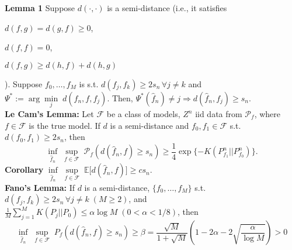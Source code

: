 \documentclass[10pt,twocolumn]{article}
\begin{document}
    \textbf{Lemma 1} Suppose $d(\cdot,\cdot)$ is a semi-distance (i.e., it satisfies 
    \begin{inparaenum}
    \item $d(f,g) = d(g,f) \geq 0$,
    \item $d(f,f) = 0$,
    \item $d(f,g) \geq d(h,f) + d(h,g)$
    \end{inparaenum}
    ). Suppose $f_0,\ldots,f_M$ is s.t. $d(f_j,f_k) \geq 2s_n \, \forall j \neq k$ and $\Psi^* := \arg \underset{j}{\min} \; d(\hat{f}_n,f,f_j)$. Then, $\Psi^*(\hat{f}_n) \neq j \Rightarrow d(\hat{f}_n,f_j) \geq s_n$.\\
    \textbf{Le Cam's Lemma:} Let $\mathcal{F}$ be a class of models, $Z^n$ iid data from $\mathcal{P}_f$, where $f\in\mathcal{F}$ is the true model. If $d$ is a semi-distance and $f_0,f_1 \in \mathcal{F}$ s.t. $d(f_0,f_1) \geq 2s_n$, then 
    \begin{equation}
        \underset{\hat{f}_n}{\inf} \; \underset{f\in\mathcal{F}} {\sup} \; \mathcal{P}_f(d(\hat{f}_n,f) \geq s_n) \geq \frac{1}{4} \exp\lbrace-K(P^n_{f_1} || P^n_{f_0})\rbrace.
    \end{equation}
    \textbf{Corollary} $\underset{\hat{f}_n}{\inf} \; \underset {f\in\mathcal{F}}{\sup} \; \mathbb{E} \lbrack d(\hat{f}_n,f)\rbrack \geq cs_n$.\\
    \textbf{Fano's Lemma:} If $d$ is a semi-distance, $\lbrace f_0,\ldots,f_M \rbrace$ s.t. $d(f_j,f_k) \geq 2s_n \, \forall j \neq k \; (M \geq 2)$, and $\frac{1}{M}\sum_{j=1}^{M} K(P_j||P_0) \leq \alpha \log M \; (0 < \alpha < 1/8)$, then
    \begin{equation}
        \underset{\hat{f}_n}{\inf} \; \underset{f\in\mathcal{F}}{\sup} \; P_f(d(\hat{f}_n,f) \geq s_n) \geq \beta = \frac{\sqrt{M}}{1+\sqrt{M}}\left(1 - 2\alpha - 2\sqrt{\frac{\alpha}{\log M}}\right) > 0
    \end{equation}
\end{document}
